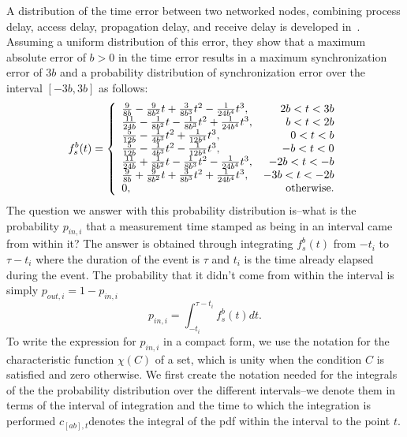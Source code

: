 A distribution of the time error between two networked nodes, combining process delay, access delay, propagation delay, and receive delay is developed in~\cite{timing-error}. Assuming a uniform distribution of this error, they show that a maximum absolute error of $b>0$ in the time error results in a maximum synchronization error of $3b$ and a probability distribution of synchronization error over the interval $[-3b, 3b]$ as follows:
\begin{equation}\label{eqn:syncerrordist}
    f_s^b(t)=\left\{\begin{array}{lr}
    {9 \over 8 b}-{9 \over 8 b^2}t+{3\over8 b^3}t^2-{1\over 24b^4}t^3, & 2b<t<3b\\
    {11\over 24b}-{1\over 8b^2}t-{1\over 8b^3}t^2+{1\over 24b^4}t^3, & b<t<2b\\
    {5\over 12b}-{1\over 4b^3}t^2+{1\over 12 b^4}t^3, & 0<t<b\\
    {5\over 12b}-{1\over 4b^3}t^2-{1\over 12 b^4}t^3, & -b<t<0\\
    {11\over 24b}+{1\over 8b^2}t-{1\over 8b^3}t^2-{1\over 24b^4}t^3, & -2b<t<-b\\
    {9 \over 8 b}+{9 \over 8 b^2}t+{3\over8 b^3}t^2+{1\over 24b^4}t^3, & -3b<t<-2b\\
    0, &\mathrm{otherwise.}
    \end{array} \right.
\end{equation}
The question we answer with this probability distribution is--what is the probability $p_{in,i}$ that a measurement time stamped as being in an interval came from within it? The answer is obtained through integrating $f_s^b(t)$ from $-t_i$ to $\tau-t_i$ where the duration of the event is $\tau$ and $t_i$ is the time already elapsed during the event. The probability that it didn't come from within the interval is simply $p_{out,i}=1-p_{in,i}$
\begin{equation}
p_{in,i}=\int_{-t_i}^{\tau-t_i}f_s^b(t)dt\label{eqn:pin} .
\end{equation}
To write the expression for $p_{in,i}$ in a compact form, we use the notation for the characteristic function $\chi(C)$ of a set, which is unity when the condition $C$ is satisfied and zero otherwise. We first create the notation needed for the integrals of the the probability distribution over the different intervals--we denote them in terms of the interval of integration and the time to which the integration is performed $c_{[a b],t}$denotes the integral of the pdf within the interval to the point $t$.
